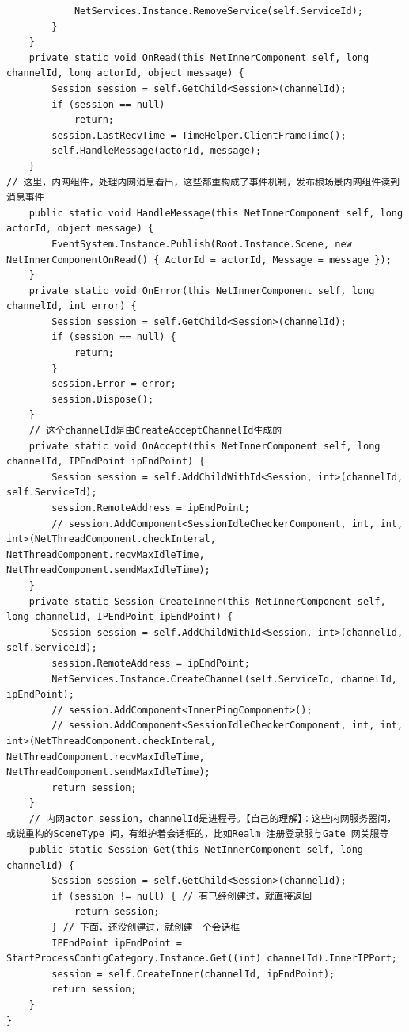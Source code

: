\documentclass[9pt, b5paper]{article}
\begin{document}
\begin{itemize}
\begin{verbatim}
            NetServices.Instance.RemoveService(self.ServiceId);
        }
    }
    private static void OnRead(this NetInnerComponent self, long channelId, long actorId, object message) {
        Session session = self.GetChild<Session>(channelId);
        if (session == null) 
            return;
        session.LastRecvTime = TimeHelper.ClientFrameTime();
        self.HandleMessage(actorId, message);
    }
// 这里，内网组件，处理内网消息看出，这些都重构成了事件机制，发布根场景内网组件读到消息事件
    public static void HandleMessage(this NetInnerComponent self, long actorId, object message) {
        EventSystem.Instance.Publish(Root.Instance.Scene, new NetInnerComponentOnRead() { ActorId = actorId, Message = message });
    }
    private static void OnError(this NetInnerComponent self, long channelId, int error) {
        Session session = self.GetChild<Session>(channelId);
        if (session == null) {
            return;
        }
        session.Error = error;
        session.Dispose();
    }
    // 这个channelId是由CreateAcceptChannelId生成的
    private static void OnAccept(this NetInnerComponent self, long channelId, IPEndPoint ipEndPoint) {
        Session session = self.AddChildWithId<Session, int>(channelId, self.ServiceId);
        session.RemoteAddress = ipEndPoint;
        // session.AddComponent<SessionIdleCheckerComponent, int, int, int>(NetThreadComponent.checkInteral, NetThreadComponent.recvMaxIdleTime, NetThreadComponent.sendMaxIdleTime);
    }
    private static Session CreateInner(this NetInnerComponent self, long channelId, IPEndPoint ipEndPoint) {
        Session session = self.AddChildWithId<Session, int>(channelId, self.ServiceId);
        session.RemoteAddress = ipEndPoint;
        NetServices.Instance.CreateChannel(self.ServiceId, channelId, ipEndPoint);
        // session.AddComponent<InnerPingComponent>();
        // session.AddComponent<SessionIdleCheckerComponent, int, int, int>(NetThreadComponent.checkInteral, NetThreadComponent.recvMaxIdleTime, NetThreadComponent.sendMaxIdleTime);
        return session;
    }
    // 内网actor session，channelId是进程号。【自己的理解】：这些内网服务器间，或说重构的SceneType 间，有维护着会话框的，比如Realm 注册登录服与Gate 网关服等
    public static Session Get(this NetInnerComponent self, long channelId) {
        Session session = self.GetChild<Session>(channelId);
        if (session != null) { // 有已经创建过，就直接返回
            return session;
        } // 下面，还没创建过，就创建一个会话框
        IPEndPoint ipEndPoint = StartProcessConfigCategory.Instance.Get((int) channelId).InnerIPPort;
        session = self.CreateInner(channelId, ipEndPoint);
        return session;
    }
}
\end{verbatim}
\end{itemize}
\end{document}
